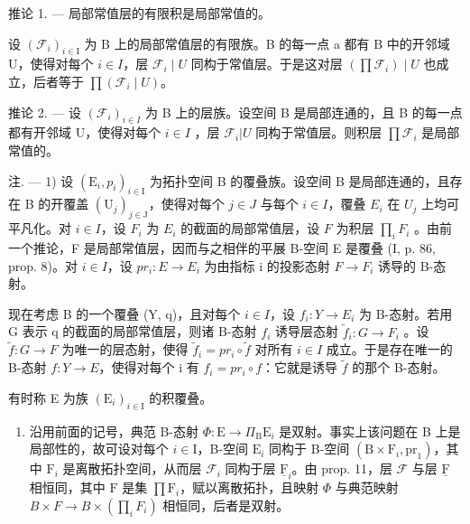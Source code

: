 推论 1. --- 局部常值层的有限积是局部常值的。

设 \((\mathcal{F}_{i})_{i\in\mathrm{I}}\) 为 B 上的局部常值层的有限族。B 的每一点 a 都有 B 中的开邻域 U，使得对每个 \(i\in I\)，层 \(\mathcal{F}_{i}\mid U\) 同构于常值层。于是这对层 \((\prod\mathcal{F}_{i})\mid U\) 也成立，后者等于 \(\prod(\mathcal{F}_{i}\mid U)\)。

推论 2. --- 设 \((\mathcal{F}_{i})_{i\in I}\) 为 B 上的层族。设空间 B 是局部连通的，且 B 的每一点都有开邻域 U，使得对每个 \(i\in I\) ，层 \(\mathcal{F}_{i}|U\) 同构于常值层。则积层 \(\prod \mathcal{F}_{i}\) 是局部常值的。

注. --- 1) 设 \((\mathrm{E}_{i}, p_{i})_{i \in \mathrm{I}}\) 为拓扑空间 B 的覆叠族。设空间 B 是局部连通的，且存在 B 的开覆盖 \((\mathrm{U}_{j})_{j \in \mathrm{J}}\)，使得对每个 \(j \in J\) 与每个 \(i \in I\)，覆叠 \(E_{i}\) 在 \(U_{j}\) 上均可平凡化。对 \(i \in I\)，设 \(F_{i}\) 为 \(E_{i}\) 的截面的局部常值层，设 \(F\) 为积层 \(\prod_{i} F_{i}\) 。由前一个推论，F 是局部常值层，因而与之相伴的平展 B-空间 E 是覆叠 (I, p. 86, prop. 8)。对 \(i \in I\)，设 \(pr_{i}: E \to E_{i}\) 为由指标 i 的投影态射 \(F \to F_{i}\) 诱导的 B-态射。

现在考虑 B 的一个覆叠 (Y, q)，且对每个 \(i \in I\)，设 \(f_i \colon Y \to E_i\) 为 B-态射。若用 G 表示 q 的截面的局部常值层，则诸 B-态射 \(f_i\) 诱导层态射 \(\widetilde{f}_i \colon G \to F_i\) 。设 \(\widetilde{f} \colon G \to F\) 为唯一的层态射，使得 \(\widetilde{f}_i = pr_i \circ \widetilde{f}\) 对所有 \(i \in I\) 成立。于是存在唯一的 B-态射 \(f \colon Y \to E\)，使得对每个 i 有 \(f_i = pr_i \circ f\)：它就是诱导 \(\widetilde{f}\) 的那个 B-态射。

有时称 E 为族 \((\mathrm{E}_i)_{i\in \mathrm{I}}\) 的积覆叠。

\begin{enumerate}
\def\labelenumi{\arabic{enumi})}
\setcounter{enumi}{1}
\tightlist
\item
  沿用前面的记号，典范 B-态射 \(\Phi\colon\mathrm{E}\to\Pi_{\mathrm{B}}\mathrm{E}_{i}\) 是双射。事实上该问题在 B 上是局部性的，故可设对每个 \(i\in\mathrm{I}\)，B-空间 \(\mathrm{E}_{i}\) 同构于 B-空间 \((\mathrm{B}\times\mathrm{F}_{i},\mathrm{pr}_{1})\)，其中 \(\mathrm{F}_{i}\) 是离散拓扑空间，从而层 \(\mathcal{F}_{i}\) 同构于层 \(\underline{\mathrm{F}}_{i}\)。由 prop. 11，层 \(\mathcal{F}\) 与层 \(\underline{\mathrm{F}}\) 相恒同，其中 \(\mathrm{F}\) 是集 \(\prod\mathrm{F}_{i}\)，赋以离散拓扑，且映射 \(\Phi\) 与典范映射 \(B \times F \rightarrow B \times (\prod_{i} F_{i})\) 相恒同，后者是双射。
\end{enumerate}

